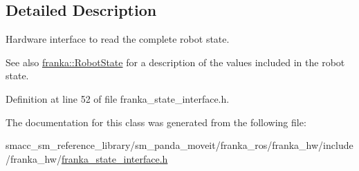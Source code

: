 \subsection{Detailed Description}
Hardware interface to read the complete robot state.

\begin{DoxySeeAlso}{See also}
\hyperlink{structfranka_1_1RobotState}{franka\+::\+Robot\+State} for a description of the values included in the robot state. 
\end{DoxySeeAlso}


Definition at line 52 of file franka\+\_\+state\+\_\+interface.\+h.



The documentation for this class was generated from the following file\+:\begin{DoxyCompactItemize}
\item 
smacc\+\_\+sm\+\_\+reference\+\_\+library/sm\+\_\+panda\+\_\+moveit/franka\+\_\+ros/franka\+\_\+hw/include/franka\+\_\+hw/\hyperlink{franka__state__interface_8h}{franka\+\_\+state\+\_\+interface.\+h}\end{DoxyCompactItemize}
